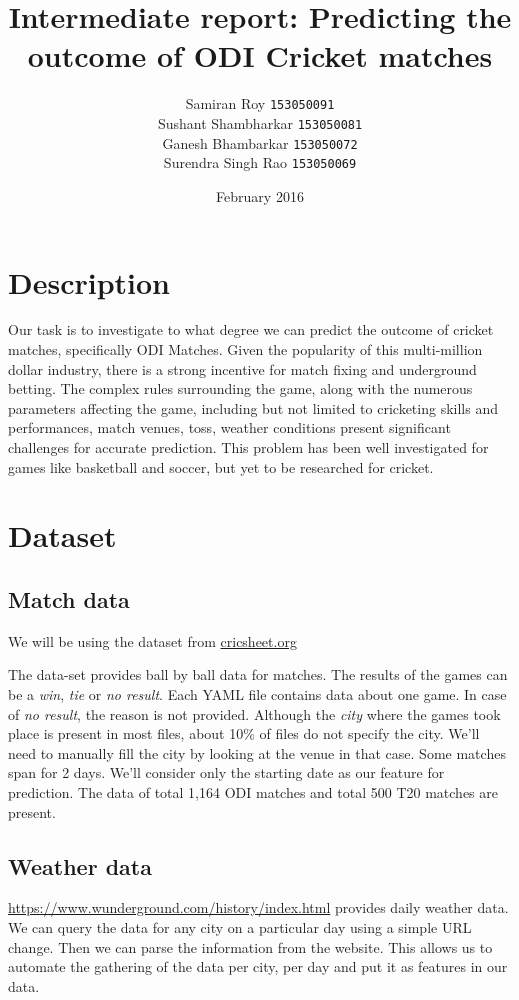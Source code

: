 \documentclass{article}
\title{Intermediate report: Predicting the outcome of ODI Cricket matches}
\author{Samiran Roy \texttt{153050091}\\Sushant Shambharkar \texttt{153050081}\\Ganesh Bhambarkar \texttt{153050072}\\Surendra Singh Rao \texttt{153050069}}
\date{February 2016}
\begin{document}
\maketitle

\section{Description}

Our task is to investigate to what degree we can predict the outcome of cricket matches, specifically ODI Matches. Given the popularity of this multi-million dollar industry, there is a strong incentive for match fixing and underground betting.  The complex rules surrounding the game, along with the numerous parameters affecting the game, including but not limited to cricketing skills and performances, match venues, toss, weather conditions present significant challenges for accurate prediction. This problem has been well investigated for games like basketball and soccer, but yet to be researched for cricket.

\section{Dataset}

\subsection{Match data}

We will be using the dataset from \url{cricsheet.org}

The data-set provides ball by ball data for matches. The results of the games can be a \emph{win}, \emph{tie} or \emph{no result}. Each YAML file contains data about one game. In case of \emph{no result}, the reason is not provided. Although the \emph{city} where the games took place is present in most files, about 10\% of files do not specify the city. We'll need to manually fill the city by looking at the venue in that case. Some matches span for 2 days. We'll consider only the starting date as our feature for prediction. The data of total 1,164 ODI matches and total 500 T20 matches are present.


\subsection{Weather data}

\url{https://www.wunderground.com/history/index.html} provides daily weather data. We can query the data for any city on a particular day using a simple URL change. Then we can parse the information from the website. This allows us to automate the gathering of the data per city, per day and put it as features in our data.
\end{document}
